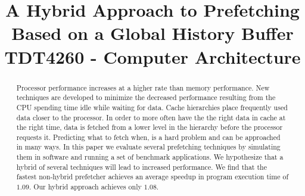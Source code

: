\documentclass[technote]{IEEEtran}
\begin{document}
\title{A Hybrid Approach to Prefetching Based on a Global History Buffer\\ TDT4260 - Computer Architecture}

\author{

}

\maketitle

\begin{abstract}
  Processor performance increases at a higher rate than memory
  performance. New techniques are developed to minimize the decreased
  performance resulting from the CPU spending time idle while waiting
  for data. Cache hierarchies place frequently used data closer to the
  processor. In order to more often have the the right data in cache
  at the right time, data is fetched from a lower level in the
  hierarchy before the processor requests it. Predicting what to fetch
  when, is a hard problem and can be approached in many ways. In this
  paper we evaluate several prefetching techniques by simulating them
  in software and running a set of benchmark applications. We
  hypothesize that a hybrid of several techniques will lead to
  increased performance. We find that the fastest non-hybrid
  prefetcher achieves an average speedup in program execution time of
  $1.09$. Our hybrid approach achieves only $1.08$.
\end{abstract}










\end{document}
